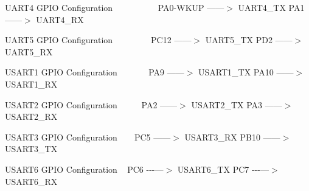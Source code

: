U\+A\+R\+T4 G\+P\+IO Configuration ~\newline
~\newline
~\newline
~\newline
~\newline
~\newline
P\+A0-\/\+W\+K\+UP ------$>$ U\+A\+R\+T4\+\_\+\+TX P\+A1 ------$>$ U\+A\+R\+T4\+\_\+\+RX

U\+A\+R\+T5 G\+P\+IO Configuration ~\newline
~\newline
~\newline
~\newline
~\newline
P\+C12 ------$>$ U\+A\+R\+T5\+\_\+\+TX P\+D2 ------$>$ U\+A\+R\+T5\+\_\+\+RX

U\+S\+A\+R\+T1 G\+P\+IO Configuration ~\newline
~\newline
~\newline
~\newline
P\+A9 ------$>$ U\+S\+A\+R\+T1\+\_\+\+TX P\+A10 ------$>$ U\+S\+A\+R\+T1\+\_\+\+RX

U\+S\+A\+R\+T2 G\+P\+IO Configuration ~\newline
~\newline
~\newline
P\+A2 ------$>$ U\+S\+A\+R\+T2\+\_\+\+TX P\+A3 ------$>$ U\+S\+A\+R\+T2\+\_\+\+RX

U\+S\+A\+R\+T3 G\+P\+IO Configuration ~\newline
~\newline
P\+C5 ------$>$ U\+S\+A\+R\+T3\+\_\+\+RX P\+B10 ------$>$ U\+S\+A\+R\+T3\+\_\+\+TX

U\+S\+A\+R\+T6 G\+P\+IO Configuration ~\newline
P\+C6 -\/-\/-\/---$>$ U\+S\+A\+R\+T6\+\_\+\+TX P\+C7 -\/-\/-\/---$>$ U\+S\+A\+R\+T6\+\_\+\+RX\mbox{\label{group___u_a_r_t___exported___functions___group1_ga0e553b32211877322f949b14801bbfa7}} 
